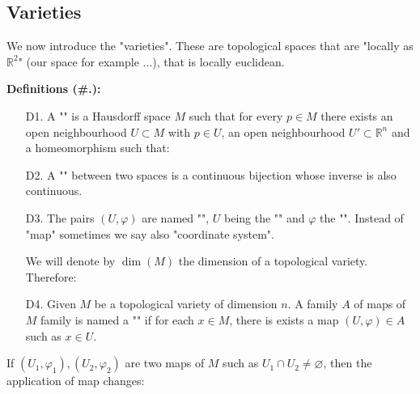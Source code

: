 	\subsection{Varieties}\label{varieties}
	We now introduce the "varieties". These are topological spaces that are "locally as $\mathbb{R}^2$" (our space for example ...), that is locally euclidean.
	
	\textbf{Definitions (\#\thesection.\mydef):}
	\begin{enumerate}
		\item[D1.] A "" is a Hausdorff space $M$ such that for every $p\in M$ there exists an open neighbourhood $U\subset M$ with $p\in U$, an open neighbourhood $U' \subset \mathbb{R}^n$ and a homeomorphism such that:
		
		\item[D2.] A "" between two spaces is a continuous bijection whose inverse is also continuous.

		\item[D3.] The pairs $(U,\varphi)$ are named "", $U$ being the "" and $\varphi$ the "". Instead of "map" sometimes we say also "coordinate system".

		\begin{tcolorbox}[title=Remark,arc=10pt,breakable,drop lifted shadow,
  skin=enhanced,
  skin first is subskin of={enhancedfirst}{arc=10pt,no shadow},
  skin middle is subskin of={enhancedmiddle}{arc=10pt,no shadow},
  skin last is subskin of={enhancedlast}{drop lifted shadow}]
		We will denote by $\dim(M)$ the dimension of a topological variety. Therefore:
		
		\end{tcolorbox}
	
		\item[D4.] Given $M$ be a topological variety of dimension $n$. A family $A$ of maps of $M$ family is named a "" if for each $x\in M$, there is exists a map $(U, \varphi)\in A$ such as $x\in U$.
	\end{enumerate}
	If $(U_1,\varphi_1),(U_2,\varphi_2)$ are two maps of $M$ such as $U_1\cap U_2\neq \varnothing$, then the application of map changes:
	
